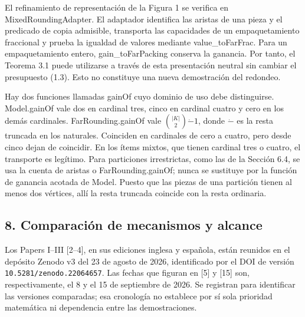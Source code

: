 \documentclass[spanish,11pt,a4paper]{article}
\begin{document}
El refinamiento de representación de la Figura 1 se verifica en {\ttfamily\small MixedRoundin\discretionary{\hbox{\ensuremath{\hookrightarrow}}}{}{}gAdapter}. El adaptador identifica las aristas de una pieza y el predicado de copia admisible, transporta las capacidades de un empaquetamiento fraccional y prueba la igualdad de valores mediante {\ttfamily\small value\_\discretionary{\hbox{\ensuremath{\hookrightarrow}}}{}{}toFarFrac}. Para un empaquetamiento entero, {\ttfamily\small gain\_\discretionary{\hbox{\ensuremath{\hookrightarrow}}}{}{}toFarPacking} conserva la ganancia. Por tanto, el Teorema 3.1 puede utilizarse a través de esta presentación neutral sin cambiar el presupuesto (1.3). Esto no constituye una nueva demostración del redondeo.

Hay dos funciones llamadas {\ttfamily\small gainOf} cuyo dominio de uso debe distinguirse. {\ttfamily\small Model.\discretionary{\hbox{\ensuremath{\hookrightarrow}}}{}{}gainOf} vale dos en cardinal tres, cinco en cardinal cuatro y cero en los demás cardinales. {\ttfamily\small FarRounding.\discretionary{\hbox{\ensuremath{\hookrightarrow}}}{}{}gainOf} vale \(\binom{|K|}{2}\mathbin{\dot-}1\), donde \(\dot-\) es la resta truncada en los naturales. Coinciden en cardinales de cero a cuatro, pero desde cinco dejan de coincidir. En los ítems mixtos, que tienen cardinal tres o cuatro, el transporte es legítimo. Para particiones irrestrictas, como las de la Sección 6.4, se usa la cuenta de aristas o {\ttfamily\small FarRounding.\discretionary{\hbox{\ensuremath{\hookrightarrow}}}{}{}gainOf}; nunca se sustituye por la función de ganancia acotada de {\ttfamily\small Model}. Puesto que las piezas de una partición tienen al menos dos vértices, allí la resta truncada coincide con la resta ordinaria.

\subsection{8. Comparación de mecanismos y alcance}\label{comparacion-de-mecanismos-y-alcance}

Los Papers I--III {[}2--4{]}, en sus ediciones inglesa y española, están reunidos en el depósito Zenodo v3 del 23 de agosto de 2026, identificado por el DOI de versión \nolinkurl{10.5281/zenodo.22064657}. Las fechas que figuran en {[}5{]} y {[}15{]} son, respectivamente, el 8 y el 15 de septiembre de 2026. Se registran para identificar las versiones comparadas; esa cronología no establece por sí sola prioridad matemática ni dependencia entre las demostraciones.
\end{document}
